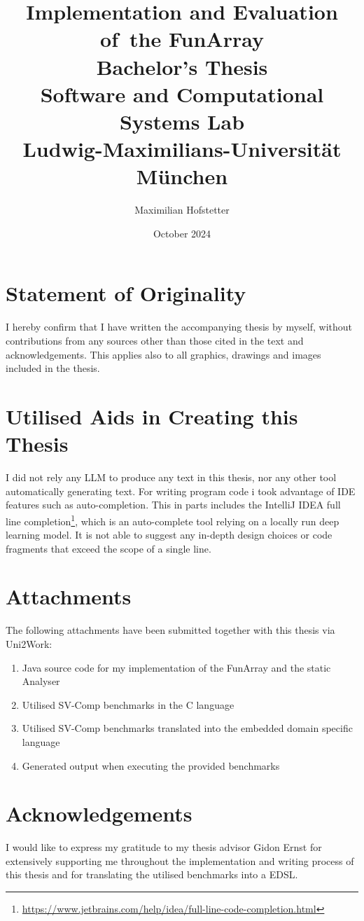 \documentclass{report}
\title{\Huge{}Implementation and Evaluation of~the FunArray\\[1em]\large{}Bachelor's Thesis\\[1em]Software and Computational Systems Lab\\Ludwig-Maximilians-Universit\"at M\"unchen}
\date{October 2024}
\author{Maximilian Hofstetter}
\begin{document}
\maketitle

\section*{Statement of Originality}
\thispagestyle{empty}
I hereby confirm that I have written the accompanying thesis by myself, without contributions from any sources other than those cited in the text and acknowledgements. This applies also to all graphics, drawings and images included in the thesis.

\section*{Utilised Aids in Creating this Thesis}

I did not rely any LLM to produce any text in this thesis, nor any other tool automatically generating text. For writing program code i took advantage of IDE features such as auto-completion. This in parts includes the IntelliJ IDEA full line completion\footnote{\url{https://www.jetbrains.com/help/idea/full-line-code-completion.html}}, which is an auto-complete tool relying on a locally run deep learning model. It is not able to suggest any in-depth design choices or code fragments that exceed the scope of a single line.

\section*{Attachments}

The following attachments have been submitted together with this thesis via Uni2Work:

\begin{enumerate}
	\item Java source code for my implementation of the FunArray and the static Analyser
	\item Utilised SV-Comp benchmarks in the C language
	\item Utilised SV-Comp benchmarks translated into the embedded domain specific language
	\item Generated output when executing the provided benchmarks
\end{enumerate}

\section*{Acknowledgements}

I would like to express my gratitude to my thesis advisor Gidon Ernst for extensively supporting me throughout the implementation and writing process of this thesis and for translating the utilised benchmarks into a EDSL.


\setcounter{tocdepth}{1}
\tableofcontents







\newpage


\end{document}
